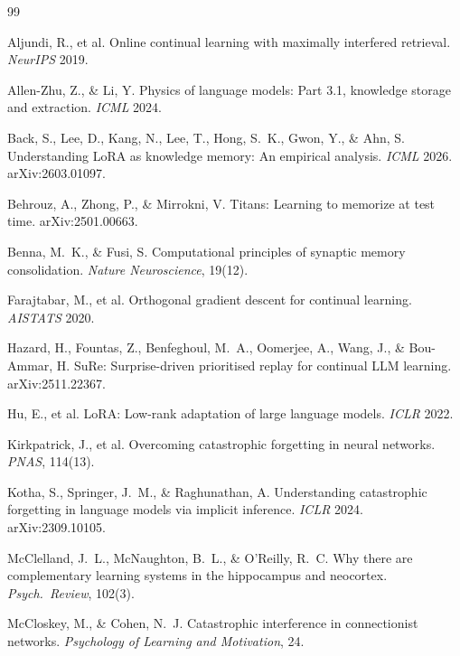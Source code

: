 \documentclass[11pt]{article}
\begin{document}
\begin{thebibliography}{99}\small

 Aljundi, R., et al. Online continual learning with
maximally interfered retrieval. \emph{NeurIPS} 2019.

 Allen-Zhu, Z., \& Li, Y. Physics of language models:
Part 3.1, knowledge storage and extraction. \emph{ICML} 2024.

 Back, S., Lee, D., Kang, N., Lee, T., Hong, S.~K., Gwon, Y.,
\& Ahn, S. Understanding LoRA as knowledge memory: An empirical analysis. \emph{ICML} 2026.
arXiv:2603.01097.

 Behrouz, A., Zhong, P., \& Mirrokni, V. Titans:
Learning to memorize at test time. arXiv:2501.00663.

 Benna, M.~K., \& Fusi, S. Computational principles of
synaptic memory consolidation. \emph{Nature Neuroscience}, 19(12).

 Farajtabar, M., et al. Orthogonal gradient
descent for continual learning. \emph{AISTATS} 2020.

 Hazard, H., Fountas, Z., Benfeghoul, M.~A., Oomerjee, A.,
Wang, J., \& Bou-Ammar, H. SuRe: Surprise-driven prioritised replay for continual LLM learning.
arXiv:2511.22367.

 Hu, E., et al. LoRA: Low-rank adaptation of large language
models. \emph{ICLR} 2022.

 Kirkpatrick, J., et al. Overcoming catastrophic
forgetting in neural networks. \emph{PNAS}, 114(13).

 Kotha, S., Springer, J.~M., \& Raghunathan, A. Understanding
catastrophic forgetting in language models via implicit inference. \emph{ICLR} 2024. arXiv:2309.10105.

 McClelland, J.~L., McNaughton, B.~L., \& O'Reilly,
R.~C. Why there are complementary learning systems in the hippocampus and neocortex. \emph{Psych.\
Review}, 102(3).

 McCloskey, M., \& Cohen, N.~J. Catastrophic
interference in connectionist networks. \emph{Psychology of Learning and Motivation}, 24.


\end{thebibliography}
\end{document}
